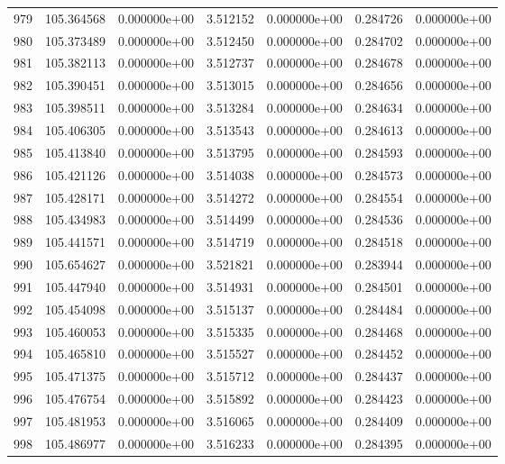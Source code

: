 \begin{tabular}{rrrrrrr}
 979 & 105.364568 &  0.000000e+00 &  3.512152 &  0.000000e+00 &   0.284726 &  0.000000e+00 \\
 980 & 105.373489 &  0.000000e+00 &  3.512450 &  0.000000e+00 &   0.284702 &  0.000000e+00 \\
 981 & 105.382113 &  0.000000e+00 &  3.512737 &  0.000000e+00 &   0.284678 &  0.000000e+00 \\
 982 & 105.390451 &  0.000000e+00 &  3.513015 &  0.000000e+00 &   0.284656 &  0.000000e+00 \\
 983 & 105.398511 &  0.000000e+00 &  3.513284 &  0.000000e+00 &   0.284634 &  0.000000e+00 \\
 984 & 105.406305 &  0.000000e+00 &  3.513543 &  0.000000e+00 &   0.284613 &  0.000000e+00 \\
 985 & 105.413840 &  0.000000e+00 &  3.513795 &  0.000000e+00 &   0.284593 &  0.000000e+00 \\
 986 & 105.421126 &  0.000000e+00 &  3.514038 &  0.000000e+00 &   0.284573 &  0.000000e+00 \\
 987 & 105.428171 &  0.000000e+00 &  3.514272 &  0.000000e+00 &   0.284554 &  0.000000e+00 \\
 988 & 105.434983 &  0.000000e+00 &  3.514499 &  0.000000e+00 &   0.284536 &  0.000000e+00 \\
 989 & 105.441571 &  0.000000e+00 &  3.514719 &  0.000000e+00 &   0.284518 &  0.000000e+00 \\
 990 & 105.654627 &  0.000000e+00 &  3.521821 &  0.000000e+00 &   0.283944 &  0.000000e+00 \\
 991 & 105.447940 &  0.000000e+00 &  3.514931 &  0.000000e+00 &   0.284501 &  0.000000e+00 \\
 992 & 105.454098 &  0.000000e+00 &  3.515137 &  0.000000e+00 &   0.284484 &  0.000000e+00 \\
 993 & 105.460053 &  0.000000e+00 &  3.515335 &  0.000000e+00 &   0.284468 &  0.000000e+00 \\
 994 & 105.465810 &  0.000000e+00 &  3.515527 &  0.000000e+00 &   0.284452 &  0.000000e+00 \\
 995 & 105.471375 &  0.000000e+00 &  3.515712 &  0.000000e+00 &   0.284437 &  0.000000e+00 \\
 996 & 105.476754 &  0.000000e+00 &  3.515892 &  0.000000e+00 &   0.284423 &  0.000000e+00 \\
 997 & 105.481953 &  0.000000e+00 &  3.516065 &  0.000000e+00 &   0.284409 &  0.000000e+00 \\
 998 & 105.486977 &  0.000000e+00 &  3.516233 &  0.000000e+00 &   0.284395 &  0.000000e+00 \\

\end{tabular}
